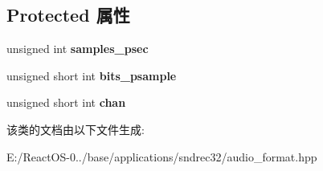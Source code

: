 \subsection*{Protected 属性}
\begin{DoxyCompactItemize}
\item 
\mbox{\label{classaudio__format_a0fb6a47b8739a58f9cc65632fdbf29fd}} 
unsigned int {\bfseries samples\+\_\+psec}
\item 
\mbox{\label{classaudio__format_a3a8bfc4e3983d05efcbce0c8ec7acafc}} 
unsigned short int {\bfseries bits\+\_\+psample}
\item 
\mbox{\label{classaudio__format_a1584850ea54edcf013550be43fcb8e38}} 
unsigned short int {\bfseries chan}
\end{DoxyCompactItemize}


该类的文档由以下文件生成\+:\begin{DoxyCompactItemize}
\item 
E\+:/\+React\+O\+S-\/0../base/applications/sndrec32/audio\+\_\+format.\+hpp\end{DoxyCompactItemize}
